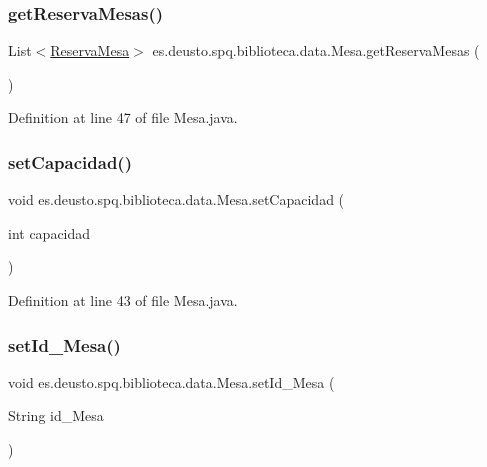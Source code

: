 \subsubsection{\texorpdfstring{get\+Reserva\+Mesas()}{getReservaMesas()}}
{\footnotesize\ttfamily List$<$\mbox{\hyperlink{classes_1_1deusto_1_1spq_1_1biblioteca_1_1data_1_1_reserva_mesa}{Reserva\+Mesa}}$>$ es.\+deusto.\+spq.\+biblioteca.\+data.\+Mesa.\+get\+Reserva\+Mesas (\begin{DoxyParamCaption}{ }\end{DoxyParamCaption})}



Definition at line 47 of file Mesa.\+java.

\mbox{\label{classes_1_1deusto_1_1spq_1_1biblioteca_1_1data_1_1_mesa_a03ca39b1e1c15d5e262d373eeb8f988e}} 
\subsubsection{\texorpdfstring{set\+Capacidad()}{setCapacidad()}}
{\footnotesize\ttfamily void es.\+deusto.\+spq.\+biblioteca.\+data.\+Mesa.\+set\+Capacidad (\begin{DoxyParamCaption}\item[{int}]{capacidad }\end{DoxyParamCaption})}



Definition at line 43 of file Mesa.\+java.

\mbox{\label{classes_1_1deusto_1_1spq_1_1biblioteca_1_1data_1_1_mesa_a3f65b40c755b53591c7b24509847901c}} 
\subsubsection{\texorpdfstring{set\+Id\+\_\+\+Mesa()}{setId\_Mesa()}}
{\footnotesize\ttfamily void es.\+deusto.\+spq.\+biblioteca.\+data.\+Mesa.\+set\+Id\+\_\+\+Mesa (\begin{DoxyParamCaption}\item[{String}]{id\+\_\+\+Mesa }\end{DoxyParamCaption})}



